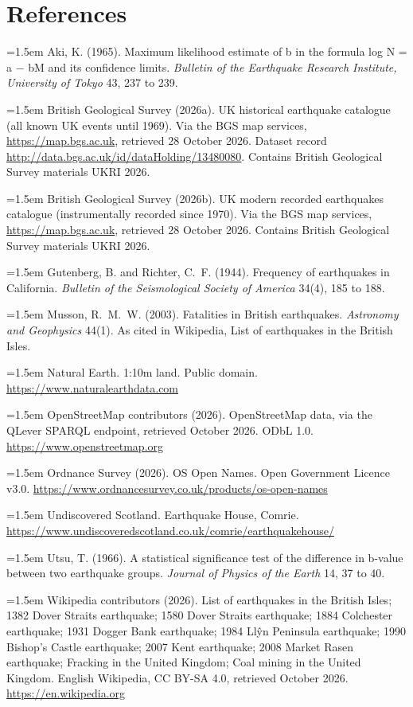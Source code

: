 \documentclass[11pt,a4paper]{article}
\begin{document}
\section*{References}
\small
\setlength{\parskip}{0.35em}
\hangindent=1.5em Aki, K. (1965). Maximum likelihood estimate of b in the formula log N = a $-$ bM and its confidence limits. \textit{Bulletin of the Earthquake Research Institute, University of Tokyo} 43, 237 to 239.

\hangindent=1.5em British Geological Survey (2026a). UK historical earthquake catalogue (all known UK events until 1969). Via the BGS map services, \url{https://map.bgs.ac.uk}, retrieved 28 October 2026. Dataset record \url{http://data.bgs.ac.uk/id/dataHolding/13480080}. Contains British Geological Survey materials \textcopyright{} UKRI 2026.

\hangindent=1.5em British Geological Survey (2026b). UK modern recorded earthquakes catalogue (instrumentally recorded since 1970). Via the BGS map services, \url{https://map.bgs.ac.uk}, retrieved 28 October 2026. Contains British Geological Survey materials \textcopyright{} UKRI 2026.

\hangindent=1.5em Gutenberg, B. and Richter, C.~F. (1944). Frequency of earthquakes in California. \textit{Bulletin of the Seismological Society of America} 34(4), 185 to 188.

\hangindent=1.5em Musson, R.~M.~W. (2003). Fatalities in British earthquakes. \textit{Astronomy and Geophysics} 44(1). As cited in Wikipedia, List of earthquakes in the British Isles.

\hangindent=1.5em Natural Earth. 1:10m land. Public domain. \url{https://www.naturalearthdata.com}

\hangindent=1.5em OpenStreetMap contributors (2026). OpenStreetMap data, via the QLever SPARQL endpoint, retrieved October 2026. ODbL 1.0. \url{https://www.openstreetmap.org}

\hangindent=1.5em Ordnance Survey (2026). OS Open Names. Open Government Licence v3.0. \url{https://www.ordnancesurvey.co.uk/products/os-open-names}

\hangindent=1.5em Undiscovered Scotland. Earthquake House, Comrie. \url{https://www.undiscoveredscotland.co.uk/comrie/earthquakehouse/}

\hangindent=1.5em Utsu, T. (1966). A statistical significance test of the difference in b-value between two earthquake groups. \textit{Journal of Physics of the Earth} 14, 37 to 40.

\hangindent=1.5em Wikipedia contributors (2026). List of earthquakes in the British Isles; 1382 Dover Straits earthquake; 1580 Dover Straits earthquake; 1884 Colchester earthquake; 1931 Dogger Bank earthquake; 1984 Ll\^{y}n Peninsula earthquake; 1990 Bishop's Castle earthquake; 2007 Kent earthquake; 2008 Market Rasen earthquake; Fracking in the United Kingdom; Coal mining in the United Kingdom. English Wikipedia, CC BY-SA 4.0, retrieved October 2026. \url{https://en.wikipedia.org}
\end{document}
